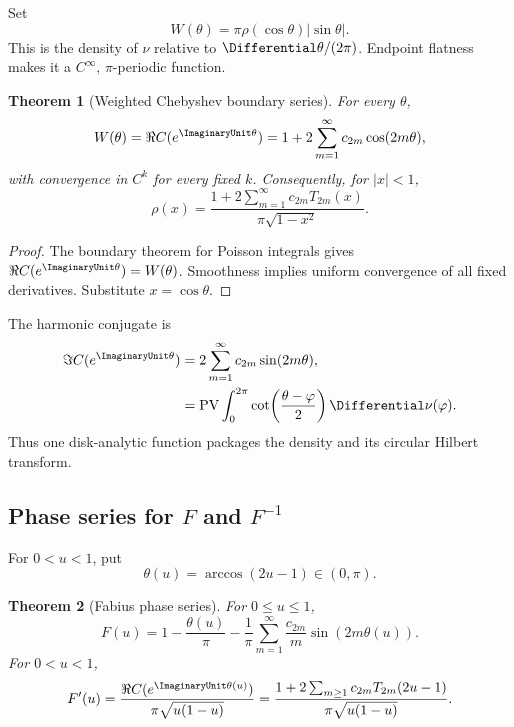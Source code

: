 \documentclass[11pt]{article}
\newtheorem{theorem}{Theorem}[section]
\theoremstyle{definition}
\theoremstyle{remark}
\newcommand{\PV}{\operatorname{PV}}
\begin{document}
Set
\begin{equation}
 W(\theta)=\pi\rho(\cos\theta)|\sin\theta|.
 \label{p7:eq:W-def}
\end{equation}
This is the density of \(\nu\) relative to \(\Differential\theta/(2\pi)\). Endpoint flatness makes it a
\(C^\infty\), \(\pi\)-periodic function.

\begin{theorem}[Weighted Chebyshev boundary series]
\label{p7:thm:boundary-rho}
For every \(\theta\),
\begin{equation}
 W(\theta)=\Re C(e^{\ImaginaryUnit\theta})
 =1+2\sum_{m=1}^{\infty}c_{2m}\cos(2m\theta),
 \label{p7:eq:W-Fourier}
\end{equation}
with convergence in \(C^k\) for every fixed \(k\). Consequently, for \(|x|<1\),
\begin{equation}
 \boxed{\displaystyle
 \rho(x)=\frac{1+2\sum_{m=1}^{\infty}c_{2m}T_{2m}(x)}
 {\pi\sqrt{1-x^2}}.}
 \label{p7:eq:rho-weighted-Cheb}
\end{equation}
\end{theorem}

\begin{proof}
The boundary theorem for Poisson integrals gives \(\Re C(e^{\ImaginaryUnit\theta})=W(\theta)\). Smoothness
implies uniform convergence of all fixed derivatives. Substitute \(x=\cos\theta\).
\end{proof}

The harmonic conjugate is
\begin{align}
 \Im C(e^{\ImaginaryUnit\theta})
 &=2\sum_{m=1}^{\infty}c_{2m}\sin(2m\theta),
 \label{p7:eq:C-imag-series}\\
 &=\PV\int_0^{2\pi}\cot\!\left(\frac{\theta-\varphi}{2}\right)\Differential\nu(\varphi).
 \label{p7:eq:C-Hilbert}
\end{align}
Thus one disk-analytic function packages the density and its circular Hilbert transform.

\subsection[Phase series for F and inverse F]{Phase series for \(F\) and \(F^{-1}\)}

For \(0<u<1\), put
\begin{equation}
 \theta(u)=\arccos(2u-1)\in(0,\pi).
 \label{p7:eq:theta-u}
\end{equation}

\begin{theorem}[Fabius phase series]
\label{p7:thm:F-phase}
For \(0\le u\le1\),
\begin{equation}
 \boxed{\displaystyle
 F(u)=1-\frac{\theta(u)}{\pi}
 -\frac1\pi\sum_{m=1}^{\infty}\frac{c_{2m}}{m}\sin(2m\theta(u)).}
 \label{p7:eq:F-phase}
\end{equation}
For \(0<u<1\),
\begin{equation}
 F'(u)=\frac{\Re C(e^{\ImaginaryUnit\theta(u)})}{\pi\sqrt{u(1-u)}}
 =\frac{1+2\sum_{m\ge1}c_{2m}T_{2m}(2u-1)}{\pi\sqrt{u(1-u)}}.
 \label{p7:eq:Fprime-C}
\end{equation}
\end{theorem}
\end{document}

